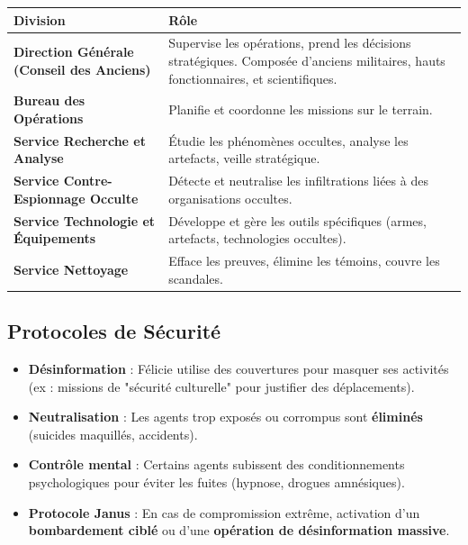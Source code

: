 \documentclass[10pt,a5paper,twoside]{book}
\begin{document}
\begin{center}
	\begin{tabular}{|>{\bfseries}P{4cm}|P{7cm}|}
	\hline
	\textbf{Division}							&	\textbf{Rôle}	\\ \hline
	Direction Générale (Conseil des Anciens)	&	Supervise les opérations, prend les décisions stratégiques. Composée d'anciens militaires, hauts fonctionnaires, et scientifiques. \\ \hline
	Bureau des Opérations						&	Planifie et coordonne les missions sur le terrain. \\ \hline
	Service Recherche et Analyse				&	Étudie les phénomènes occultes, analyse les artefacts, veille stratégique. \\ \hline
	Service Contre-Espionnage Occulte			&	Détecte et neutralise les infiltrations liées à des organisations occultes. \\ \hline
	Service Technologie et Équipements			&	Développe et gère les outils spécifiques (armes, artefacts, technologies occultes). \\ \hline
	Service Nettoyage							&	Efface les preuves, élimine les témoins, couvre les scandales. \\ \hline
	\end{tabular}
\end{center}

\newpage

\subsection{Protocoles de Sécurité}


\begin{itemize}
	\item \textbf{Désinformation} : Félicie utilise des couvertures pour masquer ses activités (ex : missions de "sécurité culturelle" pour justifier des déplacements).
	\item \textbf{Neutralisation} : Les agents trop exposés ou corrompus sont \textbf{éliminés} (suicides maquillés, accidents).
	\item \textbf{Contrôle mental} : Certains agents subissent des conditionnements psychologiques pour éviter les fuites (hypnose, drogues amnésiques).
	\item \textbf{Protocole Janus} : En cas de compromission extrême, activation d'un \textbf{bombardement ciblé} ou d'une \textbf{opération de désinformation massive}.
\end{itemize}
\end{document}
